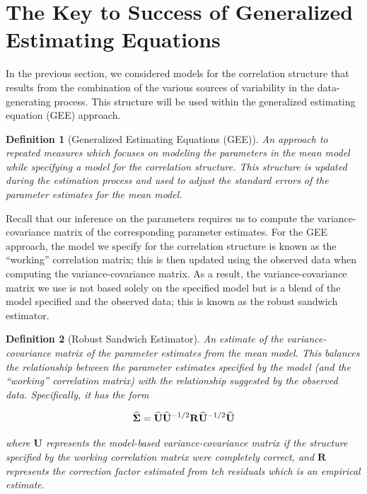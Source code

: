 \documentclass[
]{book}
\theoremstyle{plain}
\theoremstyle{mydefn}
\newtheorem{definition}{Definition}[chapter]
\theoremstyle{myexmpl}
\theoremstyle{remark}
\begin{document}
\hypertarget{the-key-to-success-of-generalized-estimating-equations}{%
\section{The Key to Success of Generalized Estimating Equations}\label{the-key-to-success-of-generalized-estimating-equations}}

In the previous section, we considered models for the correlation structure that results from the combination of the various sources of variability in the data-generating process. This structure will be used within the generalized estimating equation (GEE) approach.

\begin{definition}[Generalized Estimating Equations (GEE)]
\protect\hypertarget{def:defn-gee}{}{\label{def:defn-gee} {} }An approach to repeated measures which focuses on modeling the parameters in the mean model while specifying a model for the correlation structure. This structure is updated during the estimation process and used to adjust the standard errors of the parameter estimates for the mean model.
\end{definition}

Recall that our inference on the parameters requires us to compute the variance-covariance matrix of the corresponding parameter estimates. For the GEE approach, the model we specify for the correlation structure is known as the ``working'' correlation matrix; this is then updated using the observed data when computing the variance-covariance matrix. As a result, the variance-covariance matrix we use is not based solely on the specified model but is a blend of the model specified and the observed data; this is known as the robust sandwich estimator.

\begin{definition}[Robust Sandwich Estimator]
\protect\hypertarget{def:defn-robust-sandwich-estimator}{}{\label{def:defn-robust-sandwich-estimator} {} }An estimate of the variance-covariance matrix of the parameter estimates from the mean model. This balances the relationship between the parameter estimates specified by the model (and the ``working'' correlation matrix) with the relationship suggested by the observed data. Specifically, it has the form

\[\widehat{\boldsymbol{\Sigma}} = \widehat{\mathbf{U}} \widehat{\mathbf{U}}^{-1/2} \mathbf{R} \widehat{\mathbf{U}}^{-1/2} \widehat{\mathbf{U}}\]

where \(\bm{U}\) represents the model-based variance-covariance matrix if the structure specified by the working correlation matrix were completely correct, and \(\bm{R}\) represents the correction factor estimated from teh residuals which is an empirical estimate.\\
\end{definition}
\end{document}
